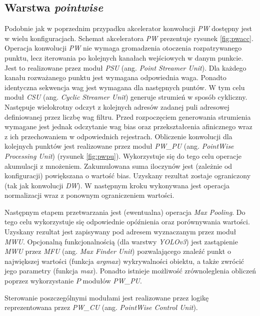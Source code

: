 \subsection{Warstwa \emph{pointwise}}
Podobnie jak w poprzednim przypadku akcelerator konwolucji \emph{PW} dostępny jest w wielu konfiguracjach.
Schemat akceleratora \emph{PW} prezentuje rysunek \ref{fig:pwacc}.
Operacja konwolucji \emph{PW} nie wymaga gromadzenia otoczenia rozpatrywanego punktu, lecz iterowania po kolejnych kanałach wejściowych w danym punkcie.
Jest to realizowane przez moduł \emph{PSU} (ang. \emph{Point Streamer Unit}).
Dla każdego kanału rozważanego punktu jest wymagana odpowiednia waga.
Ponadto identyczna sekwencja wag jest wymagana dla następnych puntów.
W tym celu moduł \emph{CSU} (ang. \emph{Cyclic Streamer Unit}) generuje strumień w sposób cykliczny.
Następuje wielokrotny odczyt z kolejnych adresów zadanej puli adresowej definiowanej przez liczbę wag filtru. 
Przed rozpoczęciem generowania strumienia wymagane jest jednak odczytanie wag bias oraz przekształcenia afinicznego wraz z ich przechowaniem w odpowiednich rejestrach.
Obliczenie konwolucji dla kolejnych punktów jest realizowane przez moduł \emph{PW\_PU} (ang. \emph{PointWise Processing Unit}) (rysunek \ref{fig:pwpu}).
Wykorzystuje się do tego celu operacje akumulacji z mnożeniem.
Zakumulowana suma iloczynów jest (zależnie od konfiguracji) powiększana o wartość bias.
Uzyskany rezultat zostaje ograniczony (tak jak konwolucji \emph{DW}).
W następnym kroku wykonywana jest operacja normalizacji wraz z ponownym ograniczeniem wartości.

Następnym etapem przetwarzania jest (ewentualna) operacja \emph{Max Pooling}.
Do tego celu wykorzystuje się odpowiednie opóźnienia oraz porównywania wartości.
Uzyskany rezultat jest zapisywany pod adresem wyznaczanym przez moduł \emph{MWU}.
Opcjonalną funkcjonalnością (dla warstwy \emph{YOLOv3}) jest zastąpienie \emph{MWU} przez \emph{MFU} (ang. \emph{Max Finder Unit}) pozwalającego znaleźć punkt o największej wartości (funkcja \emph{argmax}) wykrywalności obiektu, a także zwrócić jego parametry (funkcja \emph{max}).
Ponadto istnieje możliwość zrównoleglenia obliczeń poprzez wykorzystanie $P$ modułów \emph{PW\_PU}. 

Sterowanie poszczególnymi modułami jest realizowane przez logikę reprezentowana przez \emph{PW\_CU} (ang. \emph{PointWise Control Unit}).

